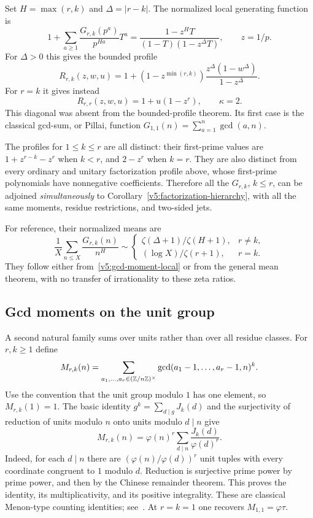 Set $H=\max(r,k)$ and $\Delta=|r-k|$.  The normalized local generating
function is
\begin{equation}\label{v5:gcd-moment-local}
 1+\sum_{a\geq1}\frac{G_{r,k}(p^a)}{p^{Ha}}T^a
       =\frac{1-z^HT}{(1-T)(1-z^\Delta T)},\qquad z=1/p.
\end{equation}
For $\Delta>0$ this gives the bounded profile
\[
 R_{r,k}(z,w,u)=
        1+(1-z^{\min(r,k)})
              \frac{z^\Delta(1-w^\Delta)}{1-z^\Delta}.
\]
For $r=k$ it gives instead
\begin{equation}\label{v5:diagonal-gcd-profile}
 R_{r,r}(z,w,u)=1+u(1-z^r),\qquad \kappa=2.
\end{equation}
This diagonal was absent from the bounded-profile theorem.  Its first
case is the classical gcd-sum, or Pillai, function
$G_{1,1}(n)=\sum_{a=1}^n\gcd(a,n)$.

The profiles for $1\leq k\leq r$ are all distinct: their first-prime
values are $1+z^{r-k}-z^r$ when $k<r$, and $2-z^r$ when $k=r$.
They are also distinct from every ordinary and unitary factorization
profile above, whose first-prime polynomials have nonnegative
coefficients.  Therefore all the $G_{r,k}$, $k\leq r$, can be adjoined
\emph{simultaneously} to Corollary~\ref{v5:factorization-hierarchy}, with
all the same moments, residue restrictions, and two-sided jets.

For reference, their normalized means are
\[
 \frac1X\sum_{n\leq X}\frac{G_{r,k}(n)}{n^H}
 \sim
 \begin{cases}
  \zeta(\Delta+1)/\zeta(H+1),&r\ne k,\\
  (\log X)/\zeta(r+1),&r=k.
 \end{cases}
\]
They follow either from~\eqref{v5:gcd-moment-local} or from the general
mean theorem, with no transfer of irrationality to these zeta ratios.

\subsection{Gcd moments on the unit group}

A second natural family sums over units rather than over all residue
classes.  For $r,k\geq1$ define
\begin{equation}\label{v5:unit-gcd-definition}
 M_{r,k}(n)=
 \sum_{a_1,\ldots,a_r\in(\mathbb Z/n\mathbb Z)^\times}
       \gcd(a_1-1,\ldots,a_r-1,n)^k.
\end{equation}
Use the convention that the unit group modulo $1$ has one element,
so $M_{r,k}(1)=1$.  The basic identity
$g^k=\sum_{d\mid g}J_k(d)$ and the surjectivity of reduction of units
modulo $n$ onto units modulo $d\mid n$ give
\begin{equation}\label{v5:unit-gcd-divisor}
 M_{r,k}(n)=\varphi(n)^r
                 \sum_{d\mid n}\frac{J_k(d)}{\varphi(d)^r}.
\end{equation}
Indeed, for each $d\mid n$ there are
$(\varphi(n)/\varphi(d))^r$ unit tuples with every coordinate congruent
to $1$ modulo $d$.  Reduction is surjective prime power by prime power,
and then by the Chinese remainder theorem.  This proves the identity,
its multiplicativity, and its positive integrality.  These are classical
Menon-type counting identities; see~\cite{TothMenon23}.  At $r=k=1$
one recovers $M_{1,1}=\varphi\tau$.

